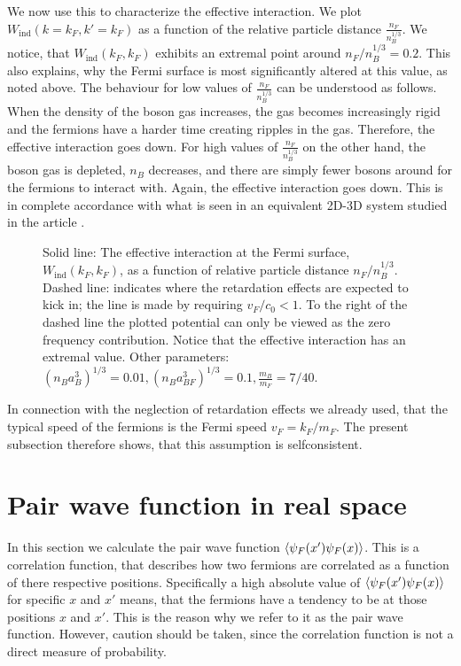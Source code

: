 We now use this to characterize the effective interaction. We plot $W_{\text{ind}}(k = k_F,k' = k_F)$ as a function of the relative particle distance $\frac{n_F}{n_B^{1/3}}$. We notice, that $W_{\text{ind}}(k_F,k_F)$ exhibits an extremal point around $n_F / n_B^{1/3} = 0.2$. This also explains, why the Fermi surface is most significantly altered at this value, as noted above. The behaviour for low values of $\frac{n_F}{n_B^{1/3}}$ can be understood as follows. When the density of the boson gas increases, the gas becomes increasingly rigid and the fermions have a harder time creating ripples in the gas. Therefore, the effective interaction goes down. For high values of $\frac{n_F}{n_B^{1/3}}$ on the other hand, the boson gas is depleted, $n_B$ decreases, and there are simply fewer bosons around for the fermions to interact with. Again, the effective interaction goes down. This is in complete accordance with what is seen in an equivalent 2D-3D system studied in the article \cite{BruunZhigangTopSuperfluid}. 

\begin{figure} 
\begin{center}  
  
\caption{Solid line: The effective interaction at the Fermi surface, $W_{\text{ind}}(k_F,k_F)$, as a function of relative particle distance $n_F/n_B^{1/3}$. Dashed line: indicates where the retardation effects are expected to kick in; the line is made by requiring $v_F/c_0 < 1$. To the right of the dashed line the plotted potential can only be viewed as the zero frequency contribution. Notice that the effective interaction has an extremal value. Other parameters: $(n_Ba_B^3)^{1/3} = 0.01, (n_Ba_{BF}^3)^{1/3} = 0.1, \frac{m_B}{m_F} = 7/40.$}  
\label{fig.EffectiveInteraction.nBdepend}  
\end{center}    
\end{figure}

In connection with the neglection of retardation effects we already used, that the typical speed of the fermions is the Fermi speed $v_F = k_F/m_F$. The present subsection therefore shows, that this assumption is selfconsistent. 

\section{Pair wave function in real space} \label{sec.1wirepairwavefunction}
In this section we calculate the pair wave function $\braket{\psi_F(x')\psi_F(x)}$. This is a correlation function, that describes how two fermions are correlated as a function of there respective positions. Specifically a high absolute value of $\braket{\psi_F(x')\psi_F(x)}$ for specific $x$ and $x'$ means, that the fermions have a tendency to be at those positions $x$ and $x'$. This is the reason why we refer to it as the pair wave function. However, caution should be taken, since the correlation function is not a direct measure of probability. 

